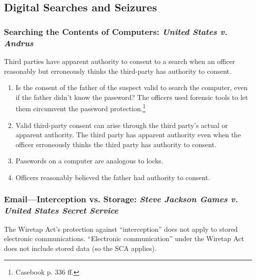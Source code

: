 \subsection{Digital Searches and Seizures}

\subsubsection{Searching the Contents of Computers: \emph{United States v. 
Andrus}}

Third parties have apparent authority to consent to a search when an officer 
reasonably but erroneously thinks the third-party has authority to consent.

\begin{enumerate}
    \item Is the consent of the father of the suspect valid to search the 
    computer, even if the father didn't know the password? The officers used 
    forensic tools to let them circumvent the password 
    protection.\footnote{Casebook p. 336 ff.}
    \item Valid third-party consent can arise through the third party's actual 
    or apparent authority. The third party has apparent authority even when 
    the officer erroneously thinks the third party has authority to consent.
    \item Passwords on a computer are analogous to locks.
    \item Officers reasonably believed the father had authority to consent.
\end{enumerate}

\subsubsection{Email---Interception vs. Storage: \emph{Steve Jackson Games v. 
United States Secret Service}}

The Wiretap Act's protection against ``interception'' does not apply to 
stored electronic communications. ``Electronic communication'' under the 
Wiretap Act does not include stored data (so the SCA applies).

